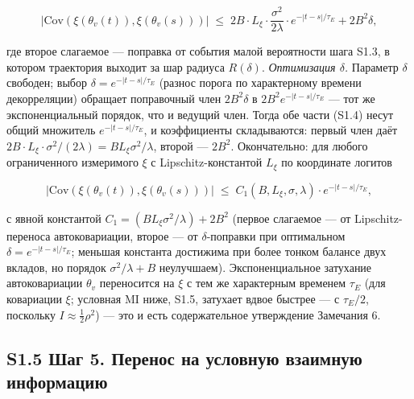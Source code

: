 \documentclass[pdflatex,sn-mathphys-ay]{sn-jnl}
\begin{document}
\begin{equation}\bigl|\text{Cov}(\xi(\theta_v(t)), \xi(\theta_v(s)))\bigr| \;\le\; 2 B \cdot L_\xi \cdot \frac{\sigma^2}{2\lambda} \cdot e^{-|t-s|/\tau_E} + 2B^2 \delta, \tag{S1.4}\end{equation}



где второе слагаемое --- поправка от события малой вероятности шага S1.3, в котором траектория выходит за шар радиуса \(R(\delta)\). \emph{Оптимизация \(\delta\).} Параметр \(\delta\) свободен; выбор \(\delta = e^{-|t-s|/\tau_E}\) (разнос порога по характерному времени декорреляции) обращает поправочный член \(2B^2\delta\) в \(2B^2 e^{-|t-s|/\tau_E}\) --- тот же экспоненциальный порядок, что и ведущий член. Тогда обе части (S1.4) несут общий множитель \(e^{-|t-s|/\tau_E}\), и коэффициенты складываются: первый член даёт \(2B\cdot L_\xi\cdot\sigma^2/(2\lambda) = B L_\xi \sigma^2/\lambda\), второй --- \(2B^2\). Окончательно: для любого ограниченного измеримого \(\xi\) с Lipschitz-константой \(L_\xi\) по координате логитов



\begin{equation}\bigl|\text{Cov}(\xi(\theta_v(t)), \xi(\theta_v(s)))\bigr| \;\le\; C_1(B, L_\xi, \sigma, \lambda) \cdot e^{-|t-s|/\tau_E}, \tag{S1.4'}\end{equation}



с явной константой \(C_1 = (B L_\xi \sigma^2/\lambda) + 2B^2\) (первое слагаемое --- от Lipschitz-переноса автоковариации, второе --- от \(\delta\)-поправки при оптимальном \(\delta = e^{-|t-s|/\tau_E}\); меньшая константа достижима при более тонком балансе двух вкладов, но порядок \(\sigma^2/\lambda + B\) неулучшаем). Экспоненциальное затухание автоковариации \(\theta_v\) переносится на \(\xi\) с тем же характерным временем \(\tau_E\) (для ковариации \(\xi\); условная MI ниже, S1.5, затухает вдвое быстрее --- с \(\tau_E/2\), поскольку \(I \approx \tfrac{1}{2}\rho^2\)) --- это и есть содержательное утверждение Замечания 6.



\subsection*{S1.5 Шаг 5. Перенос на условную взаимную информацию}\label{s1.5-ux448ux430ux433-5.-ux43fux435ux440ux435ux43dux43eux441-ux43dux430-ux443ux441ux43bux43eux432ux43dux443ux44e-ux432ux437ux430ux438ux43cux43dux443ux44e-ux438ux43dux444ux43eux440ux43cux430ux446ux438ux44e}
\end{document}
